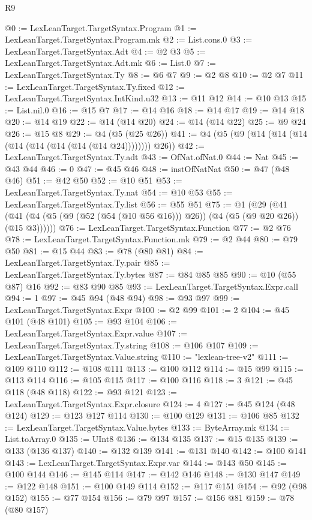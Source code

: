 \begin{lexlean}{R9}
\begin{coremodule}
{{{{{{{{{{{{{{{{{{{{{{{{{{{{{{{{{{{{{{{{{{{{{{{{{{{{{{{{{{{{{{{{{{{{{{{{{{{{{{{{{{{{{{{{{{{{{{{{{{{{{{{{{{{{@0 := LexLeanTarget.TargetSyntax.Program
@1 := LexLeanTarget.TargetSyntax.Program.mk
@2 := List.cons.{0}
@3 := LexLeanTarget.TargetSyntax.Adt
@4 := @2 @3
@5 := LexLeanTarget.TargetSyntax.Adt.mk
@6 := List.{0}
@7 := LexLeanTarget.TargetSyntax.Ty
@8 := @6 @7
@9 := @2 @8
@10 := @2 @7
@11 := LexLeanTarget.TargetSyntax.Ty.fixed
@12 := LexLeanTarget.TargetSyntax.IntKind.u32
@13 := @11 @12
@14 := @10 @13
@15 := List.nil.{0}
@16 := @15 @7
@17 := @14 @16
@18 := @14 @17
@19 := @14 @18
@20 := @14 @19
@22 := @14 (@14 @20)
@24 := @14 (@14 @22)
@25 := @9 @24
@26 := @15 @8
@29 := @4 (@5 (@25 @26))
@41 := @4 (@5 (@9 (@14 (@14 (@14 (@14 (@14 (@14 (@14 (@14 @24)))))))) @26))
@42 := LexLeanTarget.TargetSyntax.Ty.adt
@43 := OfNat.ofNat.{0}
@44 := Nat
@45 := @43 @44
@46 := 0
@47 := @45 @46
@48 := instOfNatNat
@50 := @47 (@48 @46)
@51 := @42 @50
@52 := @10 @51
@53 := LexLeanTarget.TargetSyntax.Ty.nat
@54 := @10 @53
@55 := LexLeanTarget.TargetSyntax.Ty.list
@56 := @55 @51
@75 := @1
    (@29 (@41 (@41 (@4 (@5 (@9 (@52 (@54 (@10 @56 @16))) @26)) (@4 (@5 (@9 @20 @26)) (@15 @3))))))
@76 := LexLeanTarget.TargetSyntax.Function
@77 := @2 @76
@78 := LexLeanTarget.TargetSyntax.Function.mk
@79 := @2 @44
@80 := @79 @50
@81 := @15 @44
@83 := @78 (@80 @81)
@84 := LexLeanTarget.TargetSyntax.Ty.pair
@85 := LexLeanTarget.TargetSyntax.Ty.bytes
@87 := @84 @85 @85
@90 := @10 (@55 @87) @16
@92 := @83 @90 @85
@93 := LexLeanTarget.TargetSyntax.Expr.call
@94 := 1
@97 := @45 @94 (@48 @94)
@98 := @93 @97
@99 := LexLeanTarget.TargetSyntax.Expr
@100 := @2 @99
@101 := 2
@104 := @45 @101 (@48 @101)
@105 := @93 @104
@106 := LexLeanTarget.TargetSyntax.Expr.value
@107 := LexLeanTarget.TargetSyntax.Ty.string
@108 := @106 @107
@109 := LexLeanTarget.TargetSyntax.Value.string
@110 := "lexlean-tree-v2"
@111 := @109 @110
@112 := @108 @111
@113 := @100 @112
@114 := @15 @99
@115 := @113 @114
@116 := @105 @115
@117 := @100 @116
@118 := 3
@121 := @45 @118 (@48 @118)
@122 := @93 @121
@123 := LexLeanTarget.TargetSyntax.Expr.closure
@124 := 4
@127 := @45 @124 (@48 @124)
@129 := @123 @127 @114
@130 := @100 @129
@131 := @106 @85
@132 := LexLeanTarget.TargetSyntax.Value.bytes
@133 := ByteArray.mk
@134 := List.toArray.{0}
@135 := UInt8
@136 := @134 @135
@137 := @15 @135
@139 := @133 (@136 @137)
@140 := @132 @139
@141 := @131 @140
@142 := @100 @141
@143 := LexLeanTarget.TargetSyntax.Expr.var
@144 := @143 @50
@145 := @100 @144
@146 := @145 @114
@147 := @142 @146
@148 := @130 @147
@149 := @122 @148
@151 := @100 @149 @114
@152 := @117 @151
@154 := @92 (@98 @152)
@155 := @77 @154
@156 := @79 @97
@157 := @156 @81
@159 := @78 (@80 @157)
}}}}}}}}}}}}}}}}}}}}}}}}}}}}}}}}}}}}}}}}}}}}}}}}}}}}}}}}}}}}}}}}}}}}}}}}}}}}}}}}}}}}}}}}}}}}}}}}}}}}}}}}}}}}
\end{coremodule}
\end{lexlean}
